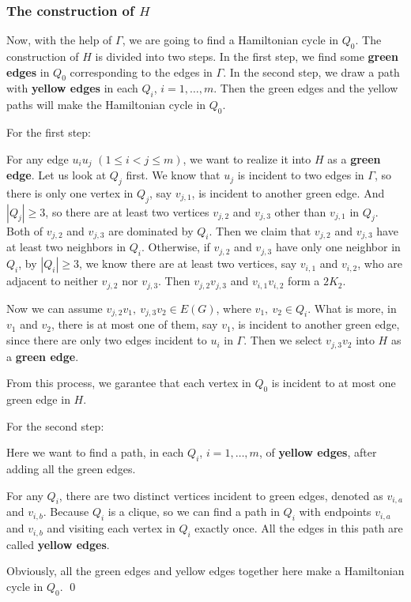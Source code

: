 \documentclass{amsart}
\begin{document}
\subsubsection{The construction of $H$}
Now, with the help of $\Gamma$, we are going to find a Hamiltonian cycle in $Q_0$. 
The construction of $H$ is divided into two steps. In the first step, we find some {\bf green edges} in $Q_0$ corresponding to the edges in $\Gamma$. In the second step, we draw a path with {\bf yellow edges} in each $Q_i$, $i=1,\ldots,m$. Then the green edges and the yellow paths will make the Hamiltonian cycle in $Q_0$.

For the first step:

For any edge $u_iu_j$ $(1\le i<j\le m)$, we want to realize it into $H$ as a {\bf green edge}. Let us look at $Q_j$ first. We know that $u_j$ is incident to two edges in $\Gamma$, so there is only one vertex in $Q_j$, say $v_{j,1}$, is incident to another green edge. And $|Q_j|\ge3$, so there are at least two vertices $v_{j,2}$ and $v_{j,3}$ other than $v_{j,1}$ in $Q_j$. Both of $v_{j,2}$ and $v_{j,3}$ are dominated by $Q_i$. Then we claim that $v_{j,2}$ and $v_{j,3}$ have at least two neighbors in $Q_i$. Otherwise, if $v_{j,2}$ and $v_{j,3}$ have only one neighbor in $Q_i$, by $|Q_i|\ge3$, we know there are at least two vertices, say $v_{i,1}$ and $v_{i,2}$, who are adjacent to neither $v_{j,2}$ nor $v_{j,3}$. Then $v_{j,2}v_{j,3}$ and $v_{i,1}v_{i,2}$ form a $2K_2$.

Now we can assume $v_{j,2}v_1,~v_{j,3}v_2\in E(G)$, where $v_1,~v_2\in Q_i$. What is more, in $v_1$ and $v_2$, there is at most one of them, say $v_1$, is incident to another green edge, since there are only two edges incident to $u_i$ in $\Gamma$. Then we select $v_{j,3}v_2$ into $H$ as a {\bf green edge}.

From this process, we garantee that each vertex in $Q_0$ is incident to at most one green edge in $H$.

For the second step:

Here we want to find a path, in each $Q_i$, $i=1,\dots,m$, of {\bf yellow edges}, after adding all the green edges.

For any $Q_i$, there are two distinct vertices incident to green edges, denoted as $v_{i,a}$ and $v_{i,b}$. Because $Q_i$ is a clique, so we can find a path in $Q_i$ with endpoints $v_{i,a}$ and $v_{i,b}$ and visiting each vertex in $Q_i$ exactly once. All the edges in this path are called {\bf yellow edges}.

Obviously, all the green edges and yellow edges together here make a Hamiltonian cycle in $Q_0$.  \qed
\end{document}
